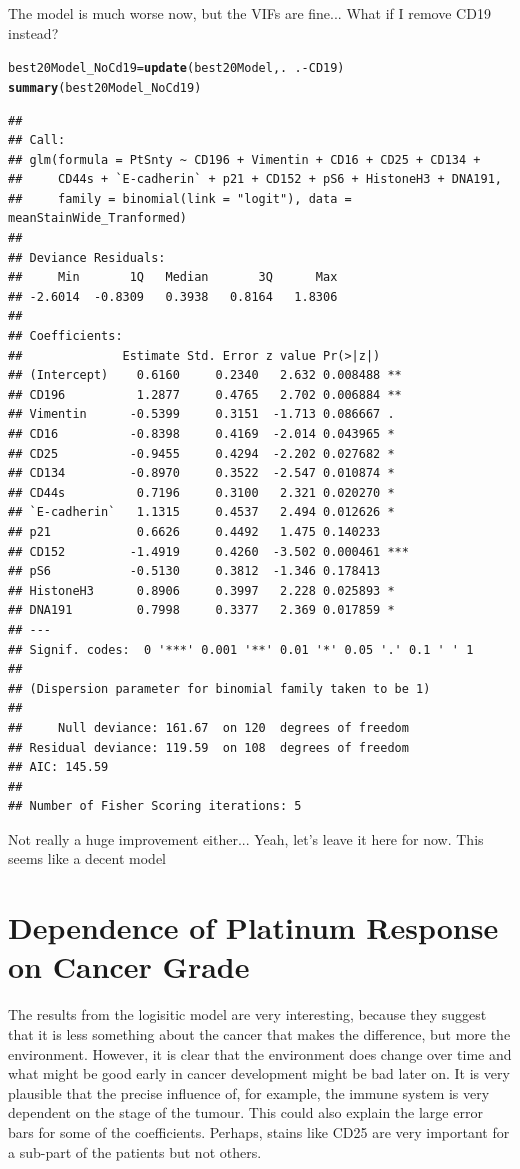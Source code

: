 \documentclass[a4paper]{article}\usepackage[]{graphicx}\usepackage[]{color}
\makeatletter
\newcommand{\hlopt}[1]{\textcolor[rgb]{0,0,0}{#1}}%
\newcommand{\hlstd}[1]{\textcolor[rgb]{0.345,0.345,0.345}{#1}}%
\newcommand{\hlkwb}[1]{\textcolor[rgb]{0.69,0.353,0.396}{#1}}%
\newcommand{\hlkwd}[1]{\textcolor[rgb]{0.737,0.353,0.396}{\textbf{#1}}}%
\newenvironment{kframe}{%
 \def\at@end@of@kframe{}%
 \ifinner\ifhmode%
  \def\at@end@of@kframe{\end{minipage}}%
  \begin{minipage}{\columnwidth}%
 \fi\fi%
 \def\FrameCommand##1{\hskip\@totalleftmargin \hskip-\fboxsep
 \colorbox{shadecolor}{##1}\hskip-\fboxsep
     \hskip-\linewidth \hskip-\@totalleftmargin \hskip\columnwidth}%
 \MakeFramed {\advance\hsize-\width
   \@totalleftmargin\z@ \linewidth\hsize
   \@setminipage}}%
 {\par\unskip\endMakeFramed%
 \at@end@of@kframe}
\newenvironment{knitrout}{}{} %
\makeatother
\begin{document}
The model is much worse now, but the VIFs are fine... What if I remove CD19 instead?

\begin{knitrout}
\color{fgcolor}\begin{kframe}
\begin{alltt}
\hlstd{best20Model_NoCd19} \hlkwb{=} \hlkwd{update}\hlstd{(best20Model,.}\hlopt{~}\hlstd{.}\hlopt{-}\hlstd{CD19)}
\hlkwd{summary}\hlstd{(best20Model_NoCd19)}
\end{alltt}
\begin{verbatim}
## 
## Call:
## glm(formula = PtSnty ~ CD196 + Vimentin + CD16 + CD25 + CD134 + 
##     CD44s + `E-cadherin` + p21 + CD152 + pS6 + HistoneH3 + DNA191, 
##     family = binomial(link = "logit"), data = meanStainWide_Tranformed)
## 
## Deviance Residuals: 
##     Min       1Q   Median       3Q      Max  
## -2.6014  -0.8309   0.3938   0.8164   1.8306  
## 
## Coefficients:
##              Estimate Std. Error z value Pr(>|z|)    
## (Intercept)    0.6160     0.2340   2.632 0.008488 ** 
## CD196          1.2877     0.4765   2.702 0.006884 ** 
## Vimentin      -0.5399     0.3151  -1.713 0.086667 .  
## CD16          -0.8398     0.4169  -2.014 0.043965 *  
## CD25          -0.9455     0.4294  -2.202 0.027682 *  
## CD134         -0.8970     0.3522  -2.547 0.010874 *  
## CD44s          0.7196     0.3100   2.321 0.020270 *  
## `E-cadherin`   1.1315     0.4537   2.494 0.012626 *  
## p21            0.6626     0.4492   1.475 0.140233    
## CD152         -1.4919     0.4260  -3.502 0.000461 ***
## pS6           -0.5130     0.3812  -1.346 0.178413    
## HistoneH3      0.8906     0.3997   2.228 0.025893 *  
## DNA191         0.7998     0.3377   2.369 0.017859 *  
## ---
## Signif. codes:  0 '***' 0.001 '**' 0.01 '*' 0.05 '.' 0.1 ' ' 1
## 
## (Dispersion parameter for binomial family taken to be 1)
## 
##     Null deviance: 161.67  on 120  degrees of freedom
## Residual deviance: 119.59  on 108  degrees of freedom
## AIC: 145.59
## 
## Number of Fisher Scoring iterations: 5
\end{verbatim}
\end{kframe}
\end{knitrout}

Not really a huge improvement either...
Yeah, let's leave it here for now. This seems like a decent model

\section{Dependence of Platinum Response on Cancer Grade}
The results from the logisitic model are very interesting, because they suggest that it is less something about the cancer that makes the difference, but more the environment. However, it is clear that the environment does change over time and what might be good early in cancer development might be bad later on. It is very plausible that the precise influence of, for example, the immune system is very dependent on the stage of the tumour. This could also explain the large error bars for some of the coefficients. Perhaps, stains like CD25 are very important for a sub-part of the patients but not others.
\end{document}
